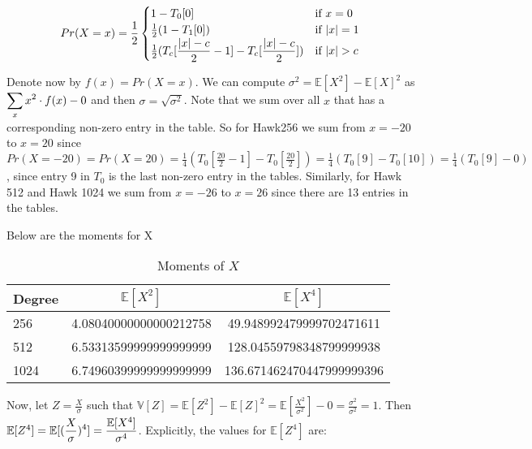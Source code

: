 \documentclass[12 pt]{article}        	%
\newcommand{\bb}[1]{\mathbb{#1}}
\begin{document}
\[
    Pr(X=x) = \frac{1}{2}
\begin{cases}
    1 - T_0[0] & \text{if } x = 0 \\
    \frac{1}{2} (1 - T_1[0]) & \text{if } \lvert x \rvert = 1 \\
    \frac{1}{2}\mathlarger{(T_c[\frac{\lvert x \rvert - c}{2} - 1] - T_c[\frac{\lvert x \rvert - c}{2}])} & \text{if } \lvert x \rvert > c
\end{cases}
\]


Denote now by $f(x) = Pr(X = x)$.
We can compute $\sigma^2 = \bb{E}[X^2] - \bb{E}[X]^2$ as $\mathlarger{\sum_{x} x^2 \cdot f(x) } - 0$ and then $\sigma = \sqrt{\sigma^2}$. Note that we sum over all $x$ that has a corresponding non-zero entry in the table. So for Hawk256 we sum from 
$x = -20$ to $x = 20$ since $Pr(X = -20) = Pr(X = 20) = \frac{1}{4} (T_0[\frac{20}{2} -1] - T_0[\frac{20}{2}]) = \frac{1}{4} (T_0[9] - T_0[10]) = \frac{1}{4} (T_0[9] - 0) $, since entry 9 in $T_0$ is the last non-zero entry in the tables.
Similarly, for Hawk 512 and Hawk 1024 we sum from $x = -26$ to $x = 26$ since there are 13 entries in the tables.

Below are the moments for X
\begin{table}[H]
    \centering
    \caption{Moments of $X$}
    \label{x moments}
    \begin{tabular}{lcc}
        \toprule
        \textbf{Degree} & $\bb{E}[X^2]$ & $\bb{E}[X^4]$ \\
        \midrule
        256 & 4.08040000000000212758 & 49.948992479999702471611 \\
        \midrule
        512 & 6.53313599999999999999 & 128.04559798348799999938 \\
        \midrule
        1024 & 6.74960399999999999999 & 136.671462470447999999396  \\
        \bottomrule
    \end{tabular}
\end{table}

Now, let $Z = \frac{X}{\sigma}$ such that $\bb{V}[Z] = \bb{E}[Z^2] - \bb{E}[Z]^2 = \bb{E}[\frac{X^2}{\sigma ^2}] - 0 = \frac{\sigma ^2}{\sigma ^2} = 1$. 
Then $\bb{E}[Z^4] = \mathlarger{\bb{E}[(\frac{X}{\sigma})^4] = \frac{\bb{E}[X^4]}{\sigma ^4}}$.
Explicitly, the values for $\bb{E}[Z^4]$ are:
\end{document}
